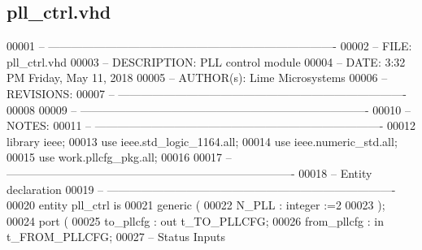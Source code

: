 \subsection{pll\+\_\+ctrl.\+vhd}
\label{pll__ctrl_8vhd_source}

\begin{DoxyCode}
00001 \textcolor{keyword}{-- ----------------------------------------------------------------------------}
00002 \textcolor{keyword}{-- FILE:          pll\_ctrl.vhd}
00003 \textcolor{keyword}{-- DESCRIPTION:   PLL control module}
00004 \textcolor{keyword}{-- DATE:          3:32 PM Friday, May 11, 2018}
00005 \textcolor{keyword}{-- AUTHOR(s):     Lime Microsystems}
00006 \textcolor{keyword}{-- REVISIONS:}
00007 \textcolor{keyword}{-- ----------------------------------------------------------------------------}
00008 
00009 \textcolor{keyword}{-- ----------------------------------------------------------------------------}
00010 \textcolor{keyword}{--NOTES:}
00011 \textcolor{keyword}{-- ----------------------------------------------------------------------------}
00012 \textcolor{vhdlkeyword}{library }\textcolor{keywordflow}{ieee};
00013 \textcolor{vhdlkeyword}{use }ieee.std\_logic\_1164.\textcolor{keywordflow}{all};
00014 \textcolor{vhdlkeyword}{use }ieee.numeric\_std.\textcolor{keywordflow}{all};
00015 \textcolor{vhdlkeyword}{use }work.pllcfg_pkg.\textcolor{keywordflow}{all};
00016 
00017 \textcolor{keyword}{-- ----------------------------------------------------------------------------}
00018 \textcolor{keyword}{-- Entity declaration}
00019 \textcolor{keyword}{-- ----------------------------------------------------------------------------}
00020 \textcolor{keywordflow}{entity }pll_ctrl \textcolor{keywordflow}{is}
00021    \textcolor{keywordflow}{generic} \textcolor{vhdlchar}{(}
00022       \textcolor{vhdlchar}{N_PLL}       \textcolor{vhdlchar}{:} \textcolor{comment}{integer} \textcolor{vhdlchar}{:=}\textcolor{vhdllogic}{}\textcolor{vhdllogic}{2}
00023    \textcolor{vhdlchar}{)};
00024   \textcolor{keywordflow}{port} \textcolor{vhdlchar}{(}
00025       \textcolor{vhdlchar}{to_pllcfg}         \textcolor{vhdlchar}{:} \textcolor{keywordflow}{out} \textcolor{vhdlchar}{t_TO_PLLCFG};
00026       \textcolor{vhdlchar}{from_pllcfg}       \textcolor{vhdlchar}{:} \textcolor{keywordflow}{in}  \textcolor{vhdlchar}{t_FROM_PLLCFG};
00027 \textcolor{keyword}{         -- Status Inputs}

\end{DoxyCode}
